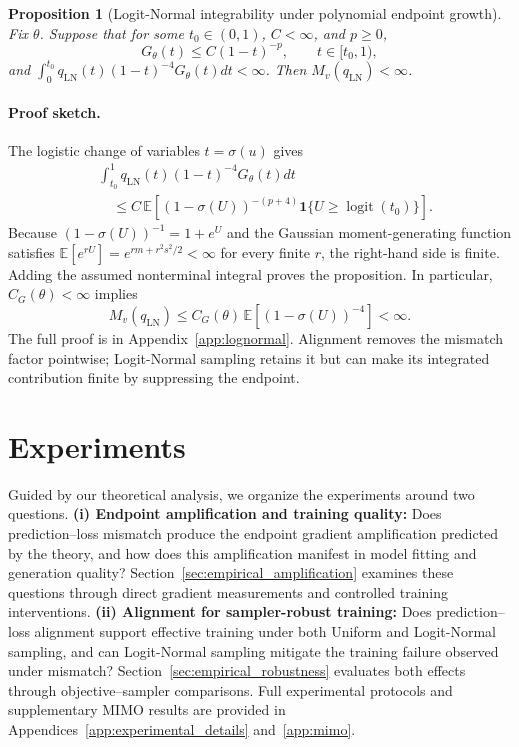 \documentclass{article}
\theoremstyle{plain}
\newtheorem{proposition}[theorem]{Proposition}
\theoremstyle{definition}
\theoremstyle{remark}
\begin{document}
\begin{proposition}[Logit-Normal integrability under polynomial endpoint growth]
\label{prop:lognormal_integrability}
Fix $\theta$. Suppose that for some $t_0\in(0,1)$, $C<\infty$, and $p\ge0$,
\begin{equation}
G_\theta(t)\le C(1-t)^{-p},\qquad t\in[t_0,1),
\label{eq:lognormal_growth}
\end{equation}
and $\int_0^{t_0}q_{\mathrm{LN}}(t)(1-t)^{-4}G_\theta(t)dt<\infty$. Then $M_v(q_{\mathrm{LN}})<\infty$.
\end{proposition}

\paragraph{Proof sketch.}
The logistic change of variables $t=\sigma(u)$ gives
\begin{equation}
\begin{aligned}
&\int_{t_0}^1q_{\mathrm{LN}}(t)(1-t)^{-4}G_\theta(t)dt \\
&\quad\le C\,\mathbb E\left[(1-\sigma(U))^{-(p+4)}\mathbf 1\{U\ge\operatorname{logit}(t_0)\}\right].
\end{aligned}
\label{eq:lognormal_tail_bound}
\end{equation}
Because $(1-\sigma(U))^{-1}=1+e^U$ and the Gaussian moment-generating function satisfies $\mathbb E[e^{rU}]=e^{rm+r^2s^2/2}<\infty$ for every finite $r$, the right-hand side is finite. Adding the assumed nonterminal integral proves the proposition. In particular, $C_G(\theta)<\infty$ implies
\begin{equation}
M_v(q_{\mathrm{LN}})
\le C_G(\theta)\,\mathbb E[(1-\sigma(U))^{-4}]<\infty.
\label{eq:lognormal_bound}
\end{equation}
The full proof is in Appendix~\ref{app:lognormal}. Alignment removes the mismatch factor pointwise; Logit-Normal sampling retains it but can make its integrated contribution finite by suppressing the endpoint.

\section{Experiments}
\label{sec:experiments}

Guided by our theoretical analysis, we organize the experiments around two questions. \textbf{(i) Endpoint amplification and training quality:} Does prediction--loss mismatch produce the endpoint gradient amplification predicted by the theory, and how does this amplification manifest in model fitting and generation quality? Section~\ref{sec:empirical_amplification} examines these questions through direct gradient measurements and controlled training interventions. \textbf{(ii) Alignment for sampler-robust training:} Does prediction--loss alignment support effective training under both Uniform and Logit-Normal sampling, and can Logit-Normal sampling mitigate the training failure observed under mismatch? Section~\ref{sec:empirical_robustness} evaluates both effects through objective--sampler comparisons. Full experimental protocols and supplementary MIMO results are provided in Appendices~\ref{app:experimental_details} and~\ref{app:mimo}.
\end{document}
